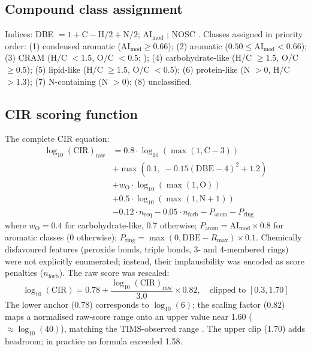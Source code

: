 \documentclass[12pt,letterpaper]{article}
\begin{document}
\subsection{Compound class assignment}

Indices: DBE $= 1 + \text{C} - \text{H}/2 + \text{N}/2$; AI$_\text{mod}$ \citep{koch2006}; NOSC \citep{larowe2011}. Classes assigned in priority order: (1) condensed aromatic (AI$_\text{mod} \geq 0.66$); (2) aromatic ($0.50 \leq \text{AI}_\text{mod} < 0.66$); (3) CRAM (H/C $< 1.5$, O/C $< 0.5$; \citealt{hertkorn2006}); (4) carbohydrate-like (H/C $\geq 1.5$, O/C $\geq 0.5$); (5) lipid-like (H/C $\geq 1.5$, O/C $< 0.5$); (6) protein-like (N $> 0$, H/C $> 1.3$); (7) N-containing (N $> 0$); (8) unclassified.

\subsection{CIR scoring function}

The complete CIR equation:
\begin{align}
\log_{10}(\text{CIR})_\text{raw} &= 0.8 \cdot \log_{10}(\max(1, \text{C}-3)) \nonumber \\
&+ \max(0.1,\; -0.15(\text{DBE}-4)^2 + 1.2) \nonumber \\
&+ w_\text{O} \cdot \log_{10}(\max(1, \text{O})) \nonumber \\
&+ 0.5 \cdot \log_{10}(\max(1, \text{N}+1)) \nonumber \\
&- 0.12 \cdot n_\text{req} - 0.05 \cdot n_\text{forb} - P_\text{arom} - P_\text{ring}
\end{align}
where $w_\text{O} = 0.4$ for carbohydrate-like, 0.7 otherwise; $P_\text{arom} = \text{AI}_\text{mod} \times 0.8$ for aromatic classes (0 otherwise); $P_\text{ring} = \max(0, \text{DBE} - R_\text{max}) \times 0.1$. Chemically disfavoured features (peroxide bonds, triple bonds, 3- and 4-membered rings) were not explicitly enumerated; instead, their implausibility was encoded as score penalties ($n_\text{forb}$). The raw score was rescaled:
\begin{equation}
\log_{10}(\text{CIR}) = 0.78 + \frac{\log_{10}(\text{CIR})_\text{raw}}{3.0} \times 0.82, \quad \text{clipped to } [0.3, 1.70]
\end{equation}
The lower anchor (0.78) corresponds to $\log_{10}(6)$; the scaling factor (0.82) maps a normalised raw-score range onto an upper value near 1.60 ($\approx \log_{10}(40)$), matching the TIMS-observed range \citep{leyva2019}. The upper clip (1.70) adds headroom; in practice no formula exceeded 1.58.
\end{document}
